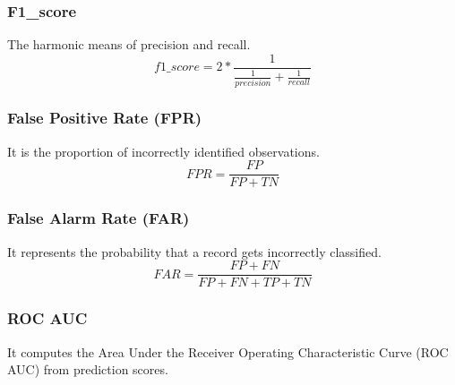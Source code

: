 \documentclass[14pt, conference]{IEEEtran}
\begin{document}
\subsubsection{F1\_score}
The harmonic means of precision and recall.
\begin{equation}
    f1\_score = 2 * \frac{1}{\frac{1}{precision}+ \frac{1}{recall}}
\end{equation}

\subsubsection{False Positive Rate (FPR)}
It is the proportion of incorrectly identified observations.
\begin{equation}
    FPR = \frac{FP}{FP+TN}
\end{equation}

\subsubsection{False Alarm Rate (FAR)}
It represents the probability that a record gets incorrectly classified.
\begin{equation}
    FAR = \frac{FP+FN}{FP+FN+TP+TN}
\end{equation}

\subsubsection{ROC AUC}
It computes the Area Under the Receiver Operating Characteristic Curve (ROC AUC) from prediction scores.


\end{document}
